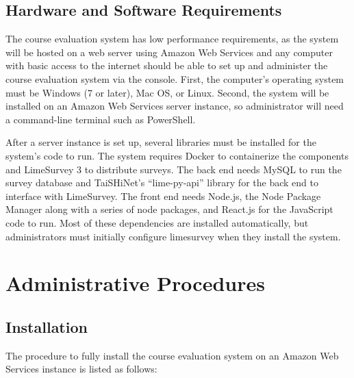 \documentclass{article}
\begin{document}
\subsection{Hardware and Software Requirements}

The course evaluation system has low performance requirements, as the system will be hosted on a web server using Amazon Web Services and any computer with basic access to the internet should be able to set up and administer the course evaluation system via the console.  First, the computer's operating system must be Windows (7 or later), Mac OS, or Linux. Second, the system will be installed on an Amazon Web Services server instance, so administrator will need a command-line terminal such as PowerShell.

After a server instance is set up, several libraries must be installed for the system's code to run. The system requires Docker to containerize the components and LimeSurvey 3 to distribute surveys. The back end needs MySQL to run the survey database and TaiSHiNet's ``lime-py-api'' library for the back end to interface with LimeSurvey. The front end needs Node.js, the Node Package Manager along with a series of node packages, and React.js for the JavaScript code to run. Most of these dependencies are installed automatically, but administrators must initially configure limesurvey when they install the system.

\section{Administrative Procedures}

\subsection{Installation}

The procedure to fully install the course evaluation system on an Amazon Web Services instance is listed as follows:
\end{document}
